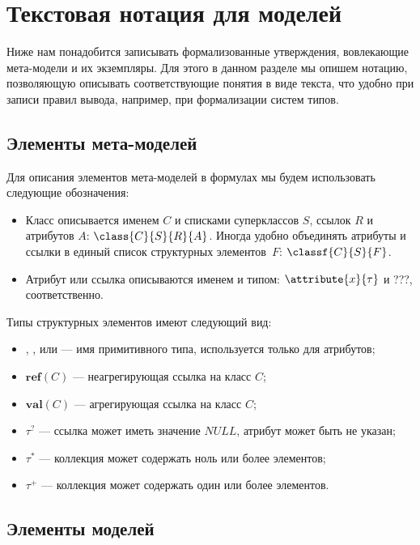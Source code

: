 \chapter{Текстовая нотация для моделей}
Ниже нам понадобится записывать формализованные утверждения, вовлекающие мета-модели и их экземпляры. Для этого в данном разделе мы опишем нотацию, позволяющую описывать соответствующие понятия в виде текста, что удобно при записи правил вывода, например, при формализации систем типов.

\section{Элементы мета-моделей}

Для описания элементов мета-моделей в формулах мы будем использовать следующие обозначения:

\begin{itemize}
\item Класс описывается именем $C$ и списками суперклассов $S$, ссылок $R$ и атрибутов $A$: $\class{C}{S}{R}{A}$. Иногда удобно объединять атрибуты и ссылки в единый список структурных элементов~$F$: $\classf{C}{S}{F}$.
\item Атрибут или ссылка описываются именем и типом: $\attribute{x}{\tau}$ и ???, соответственно.
\end{itemize}
%
\newcommand{\type}[2]{#1\left(#2\right)}%
\newcommand{\valts}{\mathbf{val}}%
\newcommand{\valt}[1]{\type{\valts}{#1}}%
\newcommand{\refts}{\mathbf{ref}}%
\newcommand{\reft}[1]{\type{\refts}{#1}}%
%
Типы структурных элементов имеют следующий вид:
\begin{itemize}
\item {}, ,  или  --- имя примитивного типа, используется только для атрибутов;
\item $\reft{C}$ --- неагрегирующая ссылка на класс $C$;
\item $\valt{C}$ --- агрегирующая ссылка на класс $C$;
\item $\tau^?$ --- ссылка может иметь значение $NULL$, атрибут может быть не указан;
\item $\tau^*$ --- коллекция может содержать ноль или более элементов;
\item $\tau^+$ --- коллекция может содержать один или более элементов.
\end{itemize}
%
\section{Элементы моделей}

